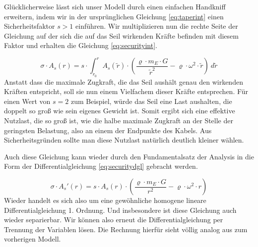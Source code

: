 \documentclass[a4paper, 10pt]{report}
\begin{document}
Glücklicherweise lässt sich unser Modell durch einen einfachen Handkniff erweitern, indem wir in der ursprünglichen Gleichung \ref{eq:taperint} einen Sicherheitsfaktor $s>1$ einführen. Wir multiplizieren nun die rechte Seite der Gleichung auf der sich die auf das Seil wirkenden Kräfte befinden mit diesem Faktor und erhalten die Gleichung \ref{eq:securityint}.

\begin{equation}
\sigma \cdot A_s(r) = s \cdot \int_{r_0}^{r} A_s(\tilde{r}) \cdot (\frac{\varrho\cdot m_E \cdot G}{\tilde{r}^2} - \varrho \cdot \omega^2 \cdot \tilde{r})\ d\tilde{r}
\label{eq:securityint}
\end{equation}
Anstatt dass die maximale Zugkraft, die das Seil aushält genau den wirkenden Kräften entspricht, soll sie nun einem Vielfachem dieser Kräfte entsprechen. Für einen Wert von $s=2$ zum Beispiel, würde das Seil eine Last aushalten, die doppelt so groß wie sein eigenes Gewicht ist. Somit ergibt sich eine effektive Nutzlast, die so groß ist, wie die halbe maximale Zugkraft an der Stelle der geringsten Belastung, also an einem der Endpunkte des Kabels. Aus Sicherheitsgründen sollte man diese Nutzlast natürlich deutlich kleiner wählen.

Auch diese Gleichung kann wieder durch den Fundamentalsatz der Analysis in die Form der Differentialgleichung \ref{eq:securitydgl} gebracht werden.

\begin{equation}
\sigma \cdot A_s'(r) = s \cdot A_s(r) \cdot (\frac{\varrho\cdot m_E \cdot G}{r^2} - \varrho \cdot \omega^2 \cdot r)
\label{eq:securitydgl}
\end{equation}
Wieder handelt es sich also um eine gewöhnliche homogene lineare Differentialgleichung 1. Ordnung. Und insbesondere ist diese Gleichung auch wieder separierbar. Wir können also erneut die Differentialgleichung per Trennung der Variablen lösen. Die Rechnung hierfür sieht völlig analog aus zum vorherigen Modell.
\end{document}

